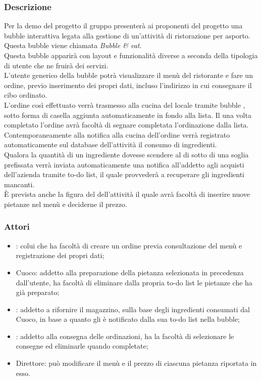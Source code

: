 \subsubsection{Descrizione}
Per la demo del progetto il gruppo \GroupName{} presenterà ai proponenti del progetto una bubble interattiva legata alla gestione di un'attività di ristorazione per asporto. Questa bubble viene chiamata \textit{Bubble \& eat}.
\\Questa bubble apparirà con layout e funzionalità diverse a seconda della tipologia di utente che ne fruirà dei servizi.
\\L'utente generico della bubble potrà visualizzare il menù del ristorante e fare un ordine, previo inserimento dei propri dati, incluso l'indirizzo in cui consegnare il cibo ordinato.
\\L'ordine così effettuato verrà trasmesso alla cucina del locale tramite bubble , sotto forma di casella aggiunta automaticamente in fondo alla lista. Il  una volta completato l'ordine avrà facoltà di segnare completata l'ordinazione dalla lista.
\\Contemporaneamente alla notifica alla cucina dell'ordine verrà registrato automaticamente sul database dell'attività il consumo di ingredienti.
\\Qualora la quantità di un ingrediente dovesse scendere al di sotto di una soglia prefissata verrà inviata automaticamente una notifica all'addetto agli acquisti dell'azienda tramite to-do list, il quale provvederà a recuperare gli ingredienti mancanti.
\\È prevista anche la figura del  dell'attività il quale avrà facoltà di inserire nuove pietanze nel menù e deciderne il prezzo.

\subsubsection{Attori}
\begin{itemize}
	\item {}: colui che ha facoltà di creare un ordine previa consultazione del menù e registrazione dei propri dati;
	\item Cuoco: addetto alla preparazione della pietanza selezionata in precedenza dall'utente, ha facoltà di eliminare dalla propria to-do list le pietanze che ha già preparato;
	\item {}: addetto a rifornire il magazzino, sulla base degli ingredienti consumati dal Cuoco, in base a quanto gli è notificato dalla sua to-do list nella bubble;
	\item {}: addetto alla consegna delle ordinazioni, ha la facoltà di selezionare le consegne ed eliminarle quando completate;
	\item Direttore: può modificare il menù e il prezzo di ciascuna pietanza riportata in esso.
\end{itemize}

